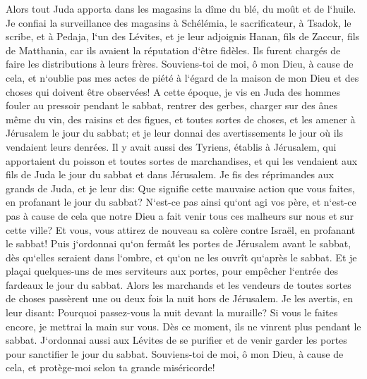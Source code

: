 \verse Alors tout Juda apporta dans les magasins la dîme du blé, du moût et de l`huile. 
\verse Je confiai la surveillance des magasins à Schélémia, le sacrificateur, à Tsadok, le scribe, et à Pedaja, l`un des Lévites, et je leur adjoignis Hanan, fils de Zaccur, fils de Matthania, car ils avaient la réputation d`être fidèles. Ils furent chargés de faire les distributions à leurs frères. 
\verse Souviens-toi de moi, ô mon Dieu, à cause de cela, et n`oublie pas mes actes de piété à l`égard de la maison de mon Dieu et des choses qui doivent être observées! 
\verse A cette époque, je vis en Juda des hommes fouler au pressoir pendant le sabbat, rentrer des gerbes, charger sur des ânes même du vin, des raisins et des figues, et toutes sortes de choses, et les amener à Jérusalem le jour du sabbat; et je leur donnai des avertissements le jour où ils vendaient leurs denrées. 
\verse Il y avait aussi des Tyriens, établis à Jérusalem, qui apportaient du poisson et toutes sortes de marchandises, et qui les vendaient aux fils de Juda le jour du sabbat et dans Jérusalem. 
\verse Je fis des réprimandes aux grands de Juda, et je leur dis: Que signifie cette mauvaise action que vous faites, en profanant le jour du sabbat? 
\verse N`est-ce pas ainsi qu`ont agi vos père, et n`est-ce pas à cause de cela que notre Dieu a fait venir tous ces malheurs sur nous et sur cette ville? Et vous, vous attirez de nouveau sa colère contre Israël, en profanant le sabbat! 
\verse Puis j`ordonnai qu`on fermât les portes de Jérusalem avant le sabbat, dès qu`elles seraient dans l`ombre, et qu`on ne les ouvrît qu`après le sabbat. Et je plaçai quelques-uns de mes serviteurs aux portes, pour empêcher l`entrée des fardeaux le jour du sabbat. 
\verse Alors les marchands et les vendeurs de toutes sortes de choses passèrent une ou deux fois la nuit hors de Jérusalem. 
\verse Je les avertis, en leur disant: Pourquoi passez-vous la nuit devant la muraille? Si vous le faites encore, je mettrai la main sur vous. Dès ce moment, ils ne vinrent plus pendant le sabbat. 
\verse J`ordonnai aussi aux Lévites de se purifier et de venir garder les portes pour sanctifier le jour du sabbat. Souviens-toi de moi, ô mon Dieu, à cause de cela, et protège-moi selon ta grande miséricorde! 
